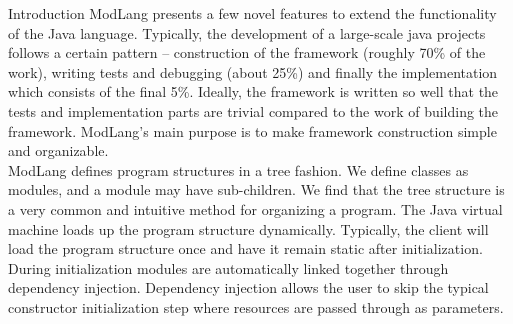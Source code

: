 \documentclass[11pt]{article}
\begin{document}
\begin{section}{Introduction}
ModLang presents a few novel features to extend the functionality of the Java language. Typically, the development of a large-scale java projects follows a certain pattern -- construction of the framework (roughly 70\% of the work), writing tests and debugging (about 25\%) and finally the implementation which consists of the final 5\%. Ideally, the framework is written so well that the tests and implementation parts are trivial compared to the work of building the framework. ModLang's main purpose is to make framework construction simple and organizable.\\


ModLang defines program structures in a tree fashion. We define classes as modules, and a module may have sub-children. We find that the tree structure is a very common and intuitive method for organizing a program. The Java virtual machine loads up the program structure dynamically. Typically, the client will load the program structure once and have it remain static after initialization. During initialization modules are automatically linked together through dependency injection. Dependency injection allows the user to skip the typical constructor initialization step where resources are passed through as parameters.\\

\end{section}
\end{document}
